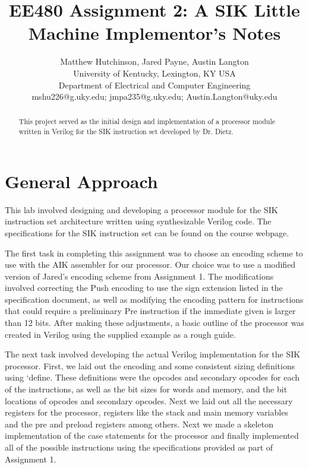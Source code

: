\documentclass[12pt, twocolumn]{article}
\begin{document}
\title{EE480 Assignment 2: A SIK Little Machine
Implementor's Notes}

\author{Matthew Hutchinson, Jared Payne, Austin Langton\\
University of Kentucky, Lexington, KY USA\\
Department of Electrical and Computer Engineering\\
mshu226@g.uky.edu; jmpa235@g.uky.edu; Austin.Langton@uky.edu\\
}

\maketitle
\begin{abstract}
This project served as the initial design and implementation of a processor module written in Verilog for the SIK instruction set developed by Dr. Dietz. 
\end{abstract}


\section{General Approach}

This lab involved designing and developing a processor module for the SIK instruction set architecture written using synthesizable Verilog code. The specifications for the SIK instruction set can be found on the course webpage.

The first task in completing this assignment was to choose an encoding scheme to use with the AIK assembler for our processor. Our choice was to use a modified version of Jared’s encoding scheme from Assignment 1. The modifications involved correcting the Push encoding to use the sign extension listed in the specification document, as well as modifying the encoding pattern for instructions that could require a preliminary Pre instruction if the immediate given is larger than 12 bits. After making these adjustments, a basic outline of the processor was created in Verilog using the supplied example as a rough guide.

The next task involved developing the actual Verilog implementation for the SIK processor. First, we laid out the encoding and some consistent sizing definitions using `define. These definitions were the opcodes and secondary opcodes for each of the instructions, as well as the bit sizes for words and memory, and the bit locations of opcodes and secondary opcodes. Next we laid out all the necessary registers for the processor, registers like the stack and main memory variables and the pre and preload registers among others. Next we made a skeleton implementation of the case statements for the processor and finally implemented all of the possible instructions using the specifications provided as part of Assignment 1.
\end{document}
